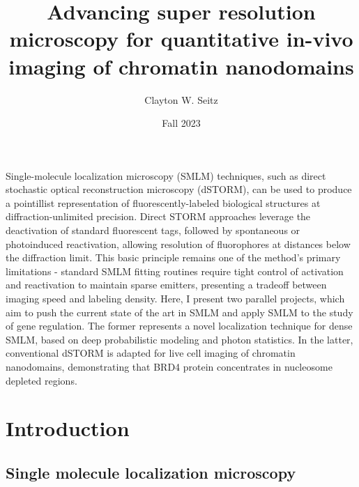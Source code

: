 \documentclass{ucetd}
\title{Advancing super resolution microscopy for quantitative in-vivo imaging of chromatin nanodomains}
\author{Clayton W. Seitz}
\date{Fall 2023}
\begin{document}
\maketitle



\tableofcontents


\abstract

Single-molecule localization microscopy (SMLM) techniques, such as direct stochastic optical reconstruction microscopy (dSTORM), can be used to produce a pointillist representation of fluorescently-labeled biological structures at diffraction-unlimited precision. Direct STORM approaches leverage the deactivation of standard fluorescent tags, followed by spontaneous or photoinduced reactivation, allowing resolution of fluorophores at distances below the diffraction limit. This basic principle remains one of the method's primary limitations - standard SMLM fitting routines require tight control of activation and reactivation to maintain sparse emitters, presenting a tradeoff between imaging speed and labeling density. Here, I present two parallel projects, which aim to push the current state of the art in SMLM and apply SMLM to the study of gene regulation. The former represents a novel localization technique for dense SMLM, based on deep probabilistic modeling and photon statistics. In the latter, conventional dSTORM is adapted for live cell imaging of chromatin nanodomains, demonstrating that BRD4 protein concentrates in nucleosome depleted regions.

\clearpage

\mainmatter

\section{Introduction}

\subsection{Single molecule localization microscopy}
\end{document}
